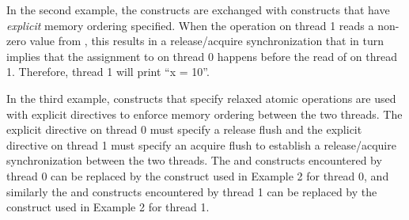 In the second example, the  constructs are exchanged with
 constructs that have \emph{explicit} memory ordering specified. When the
 operation on thread 1 reads a non-zero value from , this
results in a release/acquire synchronization that in turn implies that the
assignment to  on thread 0 happens before the read of  on thread
1. Therefore, thread 1 will print ``x = 10''.


\pagebreak
{}
In the third example,  constructs that specify relaxed atomic
operations are used with explicit  directives to enforce memory
ordering between the two threads. The explicit  directive on thread
0 must specify a release flush and the explicit  directive on
thread 1 must specify an acquire flush to establish a release/acquire
synchronization between the two threads. The  and 
constructs encountered by thread 0 can be replaced by the  construct used in
Example 2 for thread 0, and similarly the  and 
constructs encountered by thread 1 can be replaced by the 
construct used in Example 2 for thread 1.


